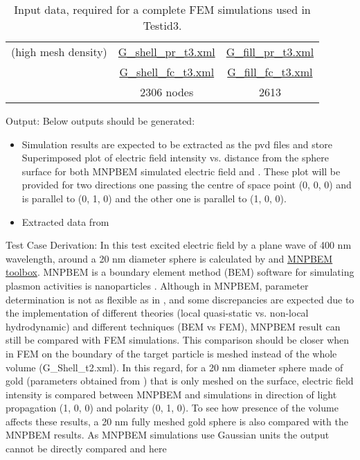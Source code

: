 \documentclass[12pt, titlepage]{article}
\begin{document}
\begin{enumerate}
\begin{table}
\begin{tabular}{|c|c|c|}
			(high mesh density)&			 \href{https://github.com/shmouses/SPDFM/tree/master/src/Mesh/G_shell_pr_t3.xml}{G\_shell\_pr\_t3.xml} & \href{https://github.com/shmouses/SPDFM/tree/master/src/Mesh/G_fill_pr_t3.xml}{G\_fill\_pr\_t3.xml} \\
			&\href{https://github.com/shmouses/SPDFM/tree/master/src/Mesh/G_shell_fc_t3.xml}{G\_shell\_fc\_t3.xml} & \href{https://github.com/shmouses/SPDFM/tree/master/src/Mesh/G_fill_fc_t3.xml}{G\_fill\_fc\_t3.xml} \\
			& 2306 nodes & 2613\\
			\hline
		\end{tabular}
		\caption{Input data, required for \progname{} a complete FEM simulations used in Testid3.}
		\label{efield}
	\end{table}
	
	Output: Below outputs should be generated: 
	
	\begin{itemize}
		\item Simulation results are expected to be extracted as the pvd files and store  Superimposed plot of electric field intensity vs. distance from the sphere surface for both MNPBEM simulated electric field and \progname{}. These plot will be provided for two directions one passing the centre of space point (0, 0, 0) and is parallel to (0, 1, 0) and the other one is parallel to (1, 0, 0).
		\item Extracted data from 
		 
    \end{itemize}	
	
	
	Test Case Derivation: In this test excited electric field by a plane wave of 400 nm wavelength, around a 20 nm diameter sphere is calculated by \progname{} and \href{https://physik.uni-graz.at/mnpbem/}{MNPBEM toolbox}. MNPBEM is a boundary element method (BEM) software for simulating plasmon activities is nanoparticles \citep{hohenester2012mnpbem}. Although in MNPBEM, parameter determination is not as flexible as in \progname{}, and some discrepancies are expected due to the implementation of different theories (local quasi-static vs. non-local hydrodynamic) and different techniques (BEM vs FEM), MNPBEM result can still be compared with FEM simulations. This comparison should be closer when  in FEM on the boundary of the target particle is meshed instead of the whole volume (G\_Shell\_t2.xml). In this regard, for a 20 nm diameter sphere made of gold (parameters obtained from \cite{grady2004influence}) that is only meshed on the surface, electric field intensity is compared between MNPBEM and \progname{} simulations in direction of light propagation (1, 0, 0) and polarity (0, 1, 0). 
	To see how presence of the volume affects these results, a 20 nm fully meshed gold sphere is also compared with the MNPBEM results. 
	As MNPBEM simulations use Gaussian units the output cannot be directly compared and here 
		

\end{enumerate}
\end{document}
